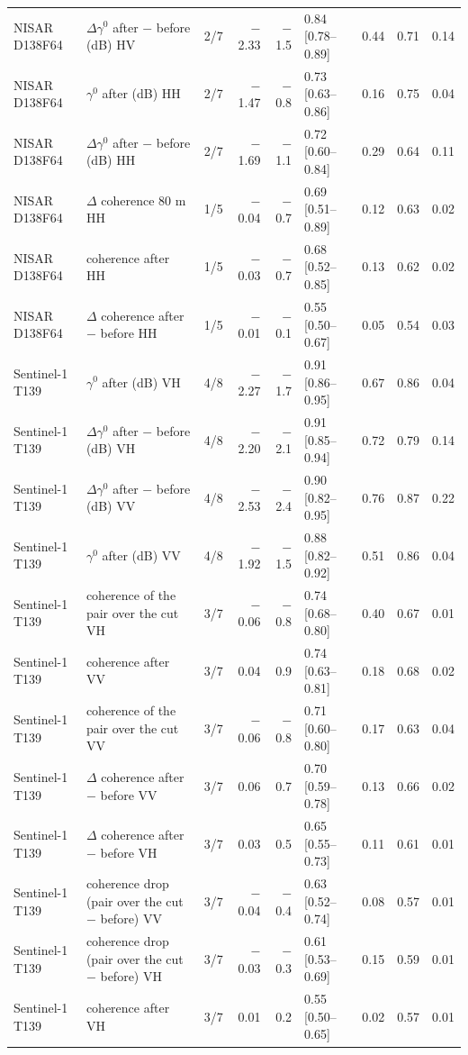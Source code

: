 \begin{table}[htbp]
\begin{tabular}{llcrrlrrr}
NISAR D138F64 & $\Delta\gamma^0$ after $-$ before (dB) HV & 2/7 & $-$2.33 & $-$1.5 & 0.84 [0.78--0.89] & 0.44 & 0.71 & 0.14 \\
NISAR D138F64 & $\gamma^0$ after (dB) HH & 2/7 & $-$1.47 & $-$0.8 & 0.73 [0.63--0.86] & 0.16 & 0.75 & 0.04 \\
NISAR D138F64 & $\Delta\gamma^0$ after $-$ before (dB) HH & 2/7 & $-$1.69 & $-$1.1 & 0.72 [0.60--0.84] & 0.29 & 0.64 & 0.11 \\
NISAR D138F64 & $\Delta$ coherence 80 m HH & 1/5 & $-$0.04 & $-$0.7 & 0.69 [0.51--0.89] & 0.12 & 0.63 & 0.02 \\
NISAR D138F64 & coherence after HH & 1/5 & $-$0.03 & $-$0.7 & 0.68 [0.52--0.85] & 0.13 & 0.62 & 0.02 \\
NISAR D138F64 & $\Delta$ coherence after $-$ before HH & 1/5 & $-$0.01 & $-$0.1 & 0.55 [0.50--0.67] & 0.05 & 0.54 & 0.03 \\
\addlinespace
Sentinel-1 T139 & $\gamma^0$ after (dB) VH & 4/8 & $-$2.27 & $-$1.7 & 0.91 [0.86--0.95] & 0.67 & 0.86 & 0.04 \\
Sentinel-1 T139 & $\Delta\gamma^0$ after $-$ before (dB) VH & 4/8 & $-$2.20 & $-$2.1 & 0.91 [0.85--0.94] & 0.72 & 0.79 & 0.14 \\
Sentinel-1 T139 & $\Delta\gamma^0$ after $-$ before (dB) VV & 4/8 & $-$2.53 & $-$2.4 & 0.90 [0.82--0.95] & 0.76 & 0.87 & 0.22 \\
Sentinel-1 T139 & $\gamma^0$ after (dB) VV & 4/8 & $-$1.92 & $-$1.5 & 0.88 [0.82--0.92] & 0.51 & 0.86 & 0.04 \\
Sentinel-1 T139 & coherence of the pair over the cut VH & 3/7 & $-$0.06 & $-$0.8 & 0.74 [0.68--0.80] & 0.40 & 0.67 & 0.01 \\
Sentinel-1 T139 & coherence after VV & 3/7 & 0.04 & 0.9 & 0.74 [0.63--0.81] & 0.18 & 0.68 & 0.02 \\
Sentinel-1 T139 & coherence of the pair over the cut VV & 3/7 & $-$0.06 & $-$0.8 & 0.71 [0.60--0.80] & 0.17 & 0.63 & 0.04 \\
Sentinel-1 T139 & $\Delta$ coherence after $-$ before VV & 3/7 & 0.06 & 0.7 & 0.70 [0.59--0.78] & 0.13 & 0.66 & 0.02 \\
Sentinel-1 T139 & $\Delta$ coherence after $-$ before VH & 3/7 & 0.03 & 0.5 & 0.65 [0.55--0.73] & 0.11 & 0.61 & 0.01 \\
Sentinel-1 T139 & coherence drop (pair over the cut $-$ before) VV & 3/7 & $-$0.04 & $-$0.4 & 0.63 [0.52--0.74] & 0.08 & 0.57 & 0.01 \\
Sentinel-1 T139 & coherence drop (pair over the cut $-$ before) VH & 3/7 & $-$0.03 & $-$0.3 & 0.61 [0.53--0.69] & 0.15 & 0.59 & 0.01 \\
Sentinel-1 T139 & coherence after VH & 3/7 & 0.01 & 0.2 & 0.55 [0.50--0.65] & 0.02 & 0.57 & 0.01 \\
\bottomrule
\end{tabular}
\end{table}
